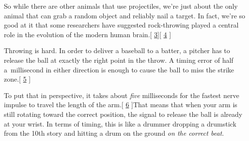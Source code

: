 {{So while there are other animals that use projectiles, we’re just about the only animal that can grab a random object and reliably nail a target. In fact, we’re so good at it that some researchers have suggested rock-throwing played a central role in the evolution of the modern human brain.[ \href{http://www.google.com/url?q=http\%3A\%2F\%2Fwww.williamcalvin.com\%2F1990s\%2F1993Unitary.htm&sa=D&sntz=1&usg=AFQjCNFfMzxb3QJNOQ08HHr6aYdPe21bqQ}{3}][ \href{http://www.google.com/url?q=http\%3A\%2F\%2Fwww.ncbi.nlm.nih.gov\%2Fpmc\%2Farticles\%2FPMC1571064\%2F&sa=D&sntz=1&usg=AFQjCNGcUJmJuwUCG7i5fe-6mvlunkgLQQ}{4} ]}

{Throwing is hard. In order to deliver a baseball to a batter, a pitcher has to release the ball at exactly the right point in the throw. A timing error of half a millisecond in either direction is enough to cause the ball to miss the strike zone.[ \href{http://www.google.com/url?q=http\%3A\%2F\%2Fjn.physiology.org\%2Fcontent\%2F75\%2F3\%2F1013.full.pdf&sa=D&sntz=1&usg=AFQjCNHkQsmhtC8IoIW5WPMmSEW\_Oj82\_g}{5} ]}

{To put that in perspective, it takes about \emph{five} milliseconds for the fastest nerve impulse to travel the length of the arm.[ \href{http://hypertextbook.com/facts/2002/DavidParizh.shtml}{6} ]That means that when your arm is still rotating toward the correct position, the signal to release the ball is already at your wrist. In terms of timing, this is like a drummer dropping a drumstick from the 10th story and hitting a drum on the ground \emph{on the correct beat}.}

}

